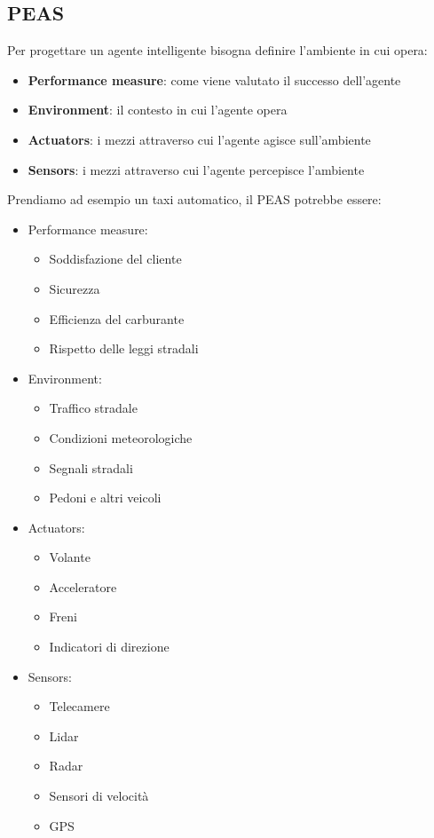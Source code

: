 \documentclass[a4paper]{article}
\begin{document}
\subsection{PEAS}
Per progettare un agente intelligente bisogna definire l'ambiente in cui opera:
\begin{itemize}
  \item \textbf{Performance measure}: come viene valutato il successo dell'agente
  \item \textbf{Environment}: il contesto in cui l'agente opera
  \item \textbf{Actuators}: i mezzi attraverso cui l'agente agisce sull'ambiente
  \item \textbf{Sensors}: i mezzi attraverso cui l'agente percepisce l'ambiente
\end{itemize}

\begin{example}
  Prendiamo ad esempio un taxi automatico, il PEAS potrebbe essere:
  \begin{itemize}
    \item Performance measure:
      \begin{itemize}
        \item Soddisfazione del cliente
        \item Sicurezza
        \item Efficienza del carburante
        \item Rispetto delle leggi stradali
      \end{itemize}
    \item Environment:
      \begin{itemize}
        \item Traffico stradale
        \item Condizioni meteorologiche
        \item Segnali stradali
        \item Pedoni e altri veicoli
      \end{itemize}
    \item Actuators:
      \begin{itemize}
        \item Volante
        \item Acceleratore
        \item Freni
        \item Indicatori di direzione
      \end{itemize}
    \item Sensors:
      \begin{itemize}
        \item Telecamere
        \item Lidar
        \item Radar
        \item Sensori di velocità
        \item GPS
      \end{itemize}
  \end{itemize}
\end{example}
\end{document}
